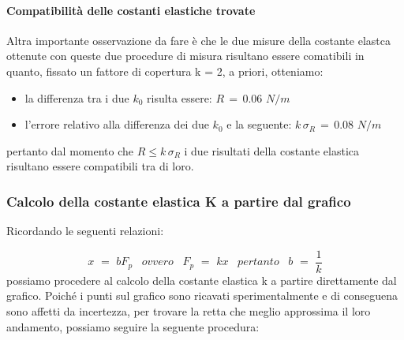 \paragraph{Compatibilità delle costanti elastiche trovate\\}
Altra importante osservazione da fare è che le due misure della costante elastca ottenute con queste due procedure di misura risultano essere comatibili in quanto, fissato un fattore di copertura k = 2, a priori, otteniamo:
\begin{itemize}
	\item{la differenza tra i due $k_0$ risulta essere: $R \,=\, 0.06 \,\, N/m$}
	\item{l'errore relativo alla differenza dei due $k_0$ e la seguente: $k \, \sigma_R \,=\, 0.08 \,\, N/m$}
\end{itemize}
pertanto dal momento che $ R \leq k \, \sigma_R$ i due risultati della costante elastica risultano essere compatibili tra di loro.

\subsubsection{Calcolo della costante elastica K a partire dal grafico}
Ricordando le seguenti relazioni:

\begin{equation}
	x \,\,=\,\, bF_p \,\,\,\,\,ovvero\,\,\,\,\, F_p \,\,=\,\, kx \,\,\,\,\,pertanto\,\,\,\,\, b \,\,=\,\, \frac{1}{k}
\end{equation}
%
possiamo procedere al calcolo della costante elastica k a partire direttamente dal grafico. Poiché i punti sul grafico sono ricavati sperimentalmente e di conseguena sono affetti da incertezza, per trovare la retta che meglio approssima il loro andamento, possiamo seguire la seguente procedura:

